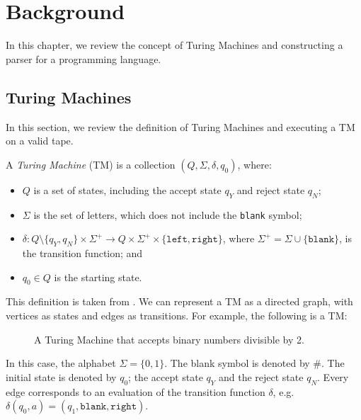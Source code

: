 \chapter{Background}
In this chapter, we review the concept of Turing Machines and constructing a parser for a programming language.

\section{Turing Machines}
In this section, we review the definition of Turing Machines and executing a TM on a valid tape.

A \emph{Turing Machine} (TM) is a collection $(Q, \Sigma, \delta, q_0)$, where:
\begin{itemize}
    \item $Q$ is a set of states, including the accept state $q_Y$ and reject state $q_N$;
    \item $\Sigma$ is the set of letters, which does not include the \texttt{blank} symbol;
    \item $\delta \colon Q \setminus \{q_Y, q_N\} \times \Sigma^+ \to Q \times \Sigma^+ \times \{\texttt{left}, \texttt{right}\}$, where $\Sigma^+ = \Sigma \cup \{\texttt{blank}\}$, is the transition function; and
    \item $q_0 \in Q$ is the starting state.
\end{itemize}
This definition is taken from \cite{dawson2007essential}. We can represent a TM as a directed graph, with vertices as states and edges as transitions. For example, the following is a TM:
\begin{figure}[H]
    \centering
    \caption{A Turing Machine that accepts binary numbers divisible by 2.}
\end{figure}
\noindent In this case, the alphabet $\Sigma = \{0, 1\}$. The blank symbol is denoted by $\#$. The initial state is denoted by $q_0$; the accept state $q_Y$ and the reject state $q_N$. Every edge corresponds to an evaluation of the transition function $\delta$, e.g. $\delta(q_0, a) = (q_1, \texttt{blank}, \texttt{right})$.

